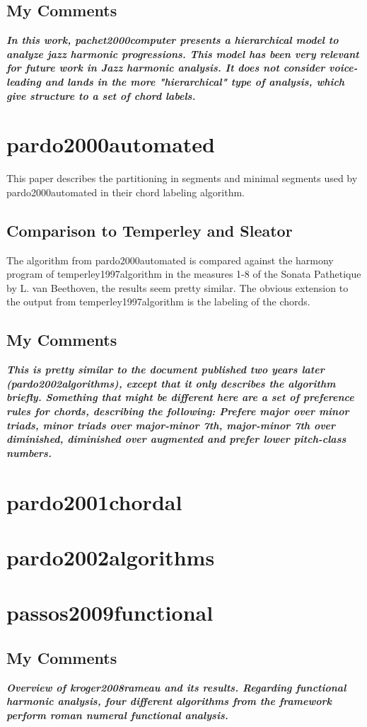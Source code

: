 		\subsection{My Comments}
			\emph{\textbf{
				In this work, pachet2000computer presents a hierarchical model to analyze jazz harmonic progressions. This model has been very relevant for future work in Jazz harmonic analysis. It does not consider voice-leading and lands in the more "hierarchical" type of analysis, which give structure to a set of chord labels.
			}}
	\section{pardo2000automated }
		This paper describes the partitioning in segments and minimal segments used by pardo2000automated in their chord labeling algorithm.
		\subsection{Comparison to Temperley and Sleator}
			The algorithm from pardo2000automated is compared against the harmony program of temperley1997algorithm in the measures 1-8 of the Sonata Pathetique by L. van Beethoven, the results seem pretty similar. The obvious extension to the output from temperley1997algorithm is the labeling of the chords.
		\subsection{My Comments}
			\emph{\textbf{
				This is pretty similar to the document published two years later (pardo2002algorithms), except that it only describes the algorithm briefly. Something that might be different here are a set of preference rules for chords, describing the following: Prefere major over minor triads, minor triads over major-minor 7th, major-minor 7th over diminished, diminished over augmented and prefer lower pitch-class numbers.
			}}
	\section{pardo2001chordal }
	\section{pardo2002algorithms }
	\section{passos2009functional }
		\subsection{My Comments}
		\emph{\textbf{
			Overview of kroger2008rameau and its results. Regarding functional harmonic analysis, four different algorithms from the framework perform roman numeral functional analysis.
		}}
